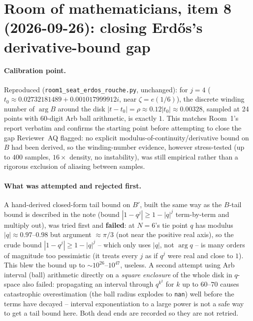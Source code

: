 \section*{Room of mathematicians, item 8 (2026-09-26): closing Erd\H os's derivative-bound gap}

\paragraph{Calibration point.} Reproduced (\texttt{room1\_seat\_erdos\_rouche.py}, unchanged): for
$j=4$ ($t_0\approx0.02732181489+0.001017999912i$, near $\zeta=e(1/6)$), the discrete winding number
of $\arg B$ around the disk $|t-t_0|=\rho\approx0.12|t_0|\approx0.00328$, sampled at 24 points with
60-digit Arb ball arithmetic, is exactly $1$. This matches Room~1's report verbatim and confirms the
starting point before attempting to close the gap Reviewer~AQ flagged: no explicit
modulus-of-continuity/derivative bound on $B$ had been derived, so the winding-number evidence, however
stress-tested (up to $400$ samples, $16\times$ density, no instability), was still empirical rather than
a rigorous exclusion of aliasing between samples.

\paragraph{What was attempted and rejected first.} A hand-derived closed-form tail bound on
$B'$, built the same way as the $B$-tail bound is described in the note (bound $|1-q^j|\ge1-|q|^j$
term-by-term and multiply out), was tried first and \textbf{failed}: at $N=6$'s tie point $q$ has
modulus $|q|\approx0.97$--$0.98$ but argument $\approx\pi/3$ (not near the positive real axis), so the
crude bound $|1-q^j|\ge1-|q|^j$ -- which only uses $|q|$, not $\arg q$ -- is many orders of magnitude too
pessimistic (it treats every $j$ as if $q^j$ were real and close to $1$). This blew the bound up to
$\sim\!10^{26}$--$10^{47}$, useless. A second attempt using Arb interval (ball) arithmetic directly on a
\emph{square enclosure} of the whole disk in $q$-space also failed: propagating an interval through
$q^{k^2}$ for $k$ up to $60$--$70$ causes catastrophic overestimation (the ball radius explodes to
\texttt{nan}) well before the terms have decayed -- interval exponentiation to a large power is not a
safe way to get a tail bound here. Both dead ends are recorded so they are not retried.

